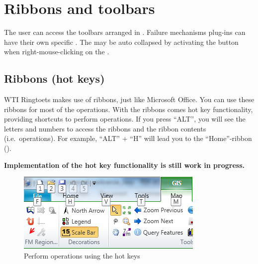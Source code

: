 
\section{Ribbons and toolbars}
\label{sec:ribbons}
The user can access the toolbars arranged in . Failure mechanisms plug-ins can have their own specific . The  may be auto collapsed by activating the  button when right-mouse-clicking on the .

\subsection{Ribbons (hot keys)}\label{subsec:gettingstarted_ribons}

WTI Ringtoets makes use of ribbons, just like Microsoft Office. You can use these ribbons for most of the operations. 
With the ribbons comes hot key functionality, providing shortcuts to perform operations.
If you press ``ALT'', you will see the letters and numbers to access the ribbons and the ribbon contents (i.e.\ operations). For example, ``ALT'' + ``H'' will lead you to the ``Home''-ribbon ().

\textbf{\Note Implementation of the hot key functionality is still work in progress.}

\begin{figure}[H]
	\centering
	\includegraphics{figures/chapter_overview/ds_ribbon_hotkey.png}
	\caption{Perform operations using the hot keys} \label{fig:ribbonhotkey}
\end{figure}

